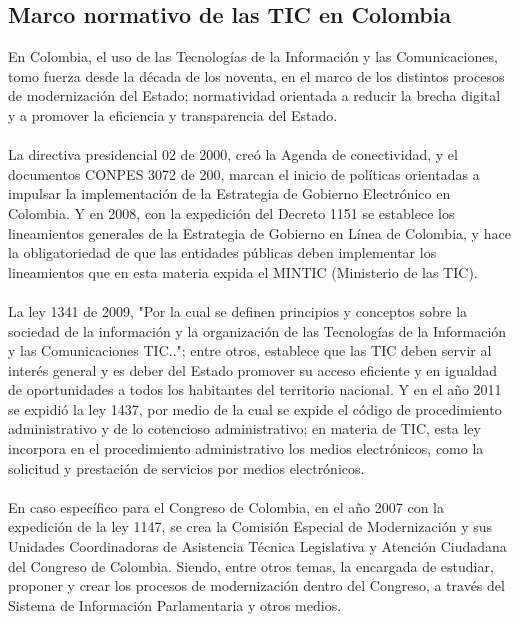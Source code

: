 \documentclass[conference]{IEEEtran}\usepackage[]{graphicx}\usepackage[]{color}
\begin{document}
\subsection{Marco normativo de las TIC en Colombia}    
En Colombia, el uso de las Tecnologías de la Información y las Comunicaciones, tomo fuerza desde la década de los noventa, en el marco de los distintos procesos de modernización del Estado; normatividad orientada a reducir la brecha digital y a promover la eficiencia y transparencia del Estado. \\ \\
La directiva presidencial 02 de 2000, creó la Agenda de conectividad, y el documentos CONPES 3072 de 200, marcan el inicio de políticas orientadas a impulsar la implementación de la Estrategia de Gobierno Electrónico en Colombia. Y en 2008, con la expedición del Decreto 1151 se establece los lineamientos generales de la Estrategia de Gobierno en Línea de Colombia, y hace la obligatoriedad de que las entidades públicas deben implementar los lineamientos que en esta materia expida el MINTIC (Ministerio de las TIC).\\ \\ 
La ley 1341 de 2009, "Por la cual se definen principios y conceptos sobre la sociedad de la información y la organización de las Tecnologías de la Información y las Comunicaciones TIC.."; entre otros, establece que las TIC deben servir al interés general y es deber del Estado promover su acceso eficiente y en igualdad de oportunidades a todos los habitantes del territorio nacional.  Y en el año 2011 se expidió la ley 1437, por medio de la cual se expide el código de procedimiento administrativo y de lo cotencioso administrativo; en materia de TIC, esta ley incorpora en el procedimiento administrativo los medios electrónicos, como la solicitud y prestación de servicios por medios electrónicos. \\ \\
En caso específico para el Congreso de Colombia, en el año 2007 con la expedición de la ley 1147, se crea la Comisión Especial de Modernización y sus Unidades Coordinadoras de Asistencia Técnica Legislativa y Atención Ciudadana del Congreso de Colombia. Siendo, entre otros temas, la encargada de estudiar, proponer y crear los procesos de modernización dentro del Congreso, a través del Sistema de Información Parlamentaria y otros medios. \\ \\


\end{document}
